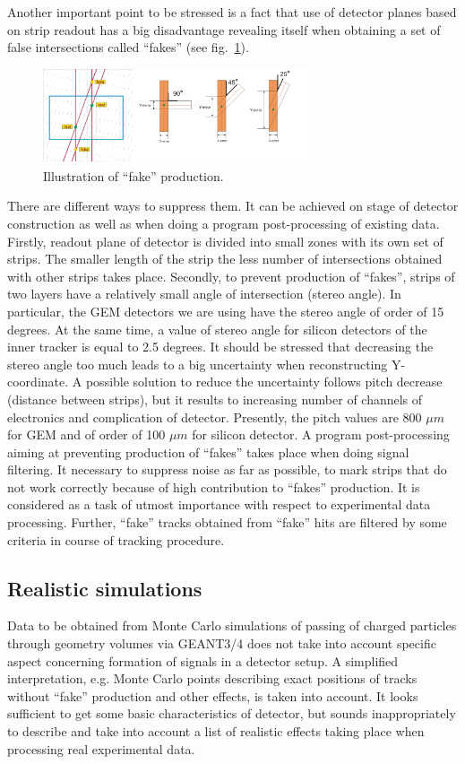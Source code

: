 \documentclass{webofc}
\begin{document}
Another important point to be stressed is a fact that use of detector planes based on strip readout has a big disadvantage revealing itself when obtaining a set of false
intersections called ``fakes'' (see fig.~\ref{fakes}).
\begin{figure}[h]
  \centering
  \includegraphics[width=8cm,clip]{fig3.png}
  \caption{Illustration of ``fake'' production.}
  \label{fakes}
\end{figure}
There are different ways to suppress them. It can be achieved on stage of detector construction as well as when doing a program post-processing of
existing data. Firstly, readout plane of detector is divided into small zones with its own set of strips. The smaller length of the strip the less number of intersections
obtained with other strips takes place. Secondly, to prevent production of ``fakes'', strips of two layers have a relatively small angle of intersection (stereo angle).
In particular, the GEM detectors we are using have the stereo angle of order of 15 degrees. At the same time, a value of stereo angle for silicon detectors of the inner tracker
is equal to 2.5 degrees. It should be stressed that decreasing the stereo angle too much leads to a big uncertainty when reconstructing Y-coordinate. A possible solution to reduce
the uncertainty follows pitch decrease (distance between strips), but it results to increasing number of channels of electronics and complication of detector. Presently, the pitch
values are 800 $\mu m$ for GEM and of order of 100 $\mu m $ for silicon detector.
A program post-processing aiming at preventing production of ``fakes'' takes place when doing signal filtering. It necessary to suppress noise as far as possible, to mark strips
that do not work correctly because of high contribution to ``fakes'' production. It is considered as a task of utmost importance with respect to experimental data processing.
Further, ``fake'' tracks obtained from ``fake'' hits are filtered by some criteria in course of tracking procedure.    

\subsection{Realistic simulations}
\label{simulations}
Data to be obtained from Monte Carlo simulations of passing of charged particles through geometry volumes via GEANT3/4 does not take into account specific aspect concerning
formation of signals in a detector setup. A simplified interpretation, e.g. Monte Carlo points describing exact positions of tracks without ``fake'' production and
other effects, is taken into account. It looks sufficient to get some basic characteristics of detector, but sounds inappropriately to describe and take into account a list of
realistic effects taking place when processing real experimental data.
\end{document}

